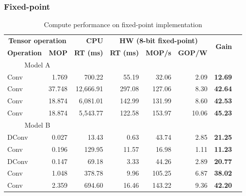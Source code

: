 \subsubsection{Fixed-point}
\begin{table}[!htp]\centering
	\caption{Compute performance on fixed-point implementation}\label{tab:performance_fixed_point }
	\scriptsize
	\begin{tabular}{lrrrrrrr}\toprule
		\multicolumn{2}{c}{\textbf{Tensor operation}} &\textbf{CPU} &\multicolumn{3}{c}{\textbf{HW (8-bit fixed-point)}} &\multirow{2}{*}{\textbf{Gain}} \\\cmidrule{1-6}
		\textbf{Operation} &\textbf{MOP} &\textbf{RT (ms)} &\textbf{RT (ms)} &\textbf{MOP/s} &\textbf{GOP/W} & \\\midrule
		\multicolumn{2}{c}{Model A} & & & & & \\
		Conv &1.769 &700.22 &55.19 &32.06 &2.09 &\textbf{12.69} \\
		Conv &37.748 &12,666.91 &297.08 &127.06 &8.30 &\textbf{42.64} \\
		Conv &18.874 &6,081.01 &142.99 &131.99 &8.60 &\textbf{42.53} \\
		Conv &18.874 &5,543.77 &122.58 &153.97 &10.06 &\textbf{45.23} \\
		\multicolumn{2}{c}{Model B} & & & & & \\
		DConv &0.027 &13.43 &0.63 &43.74 &2.85 &\textbf{21.25} \\
		Conv &0.196 &129.95 &11.57 &16.98 &1.11 &\textbf{11.23} \\
		DConv &0.147 &69.18 &3.33 &44.26 &2.89 &\textbf{20.77} \\
		Conv &1.048 &378.78 &9.96 &105.25 &6.87 &\textbf{38.02} \\
		Conv &2.359 &694.60 &16.46 &143.22 &9.36 &\textbf{42.20} \\
		\bottomrule
	\end{tabular}
\end{table}



